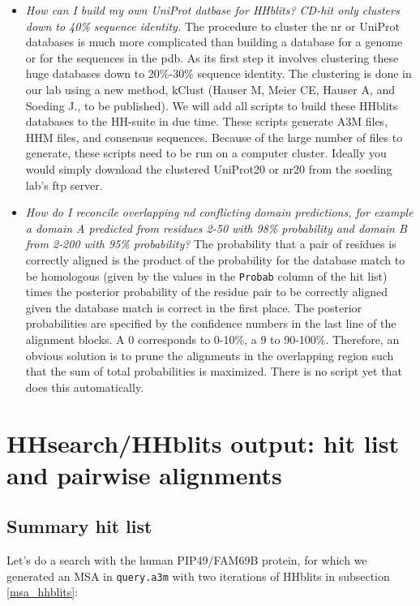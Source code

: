 \documentclass[11pt,a4paper]{article}
\begin{document}
\begin{itemize}
\item \emph{How can I build my own UniProt datbase for HHblits? CD-hit only clusters down to 40\% sequence identity.}
The procedure to cluster the nr or UniProt databases is much more complicated than building a database for a genome or for the sequences in the pdb. As its first step it involves clustering these huge databases down to 20\%-30\% sequence identity. The clustering is done in our lab using a new method, kClust (Hauser M, Meier CE, Hauser A, and Soeding J., to be published). We will add all scripts to build these HHblits databases to the HH-suite in due time. These scripts generate A3M files, HHM files, and consensus sequences. Because of the large number of files to generate, these scripts need to be run on a computer cluster. Ideally you would simply download the clustered UniProt20 or nr20 from the soeding lab's ftp server.

\item \emph{How do I reconcile overlapping nd conflicting domain predictions, for example a domain A predicted from residues 2-50 with 98\% probability and domain B from 2-200 with 95\% probability?} The probability that a pair of residues is correctly aligned is the product of the probability for the database match to be homologous (given by the values in the \verb`Probab` column of the hit list) times the posterior probability of the residue pair to be correctly aligned given the database match is correct in the first place. The posterior probabilities are specified by the confidence numbers in the last line of the alignment blocks. A 0 corresponds to 0-10\%, a 9 to 90-100\%. Therefore, an obvious solution is to prune the alignments in the overlapping region such that the sum of total probabilities is maximized. There is no script yet that does this automatically.


\end{itemize}


\section{HHsearch/HHblits output: hit list and pairwise alignments}

\subsection{Summary hit list}

Let's do a search with the human PIP49/FAM69B protein, for which we generated an MSA in \verb`query.a3m` with two iterations of HHblits in subsection \ref{msa_hhblits}:
\end{document}
